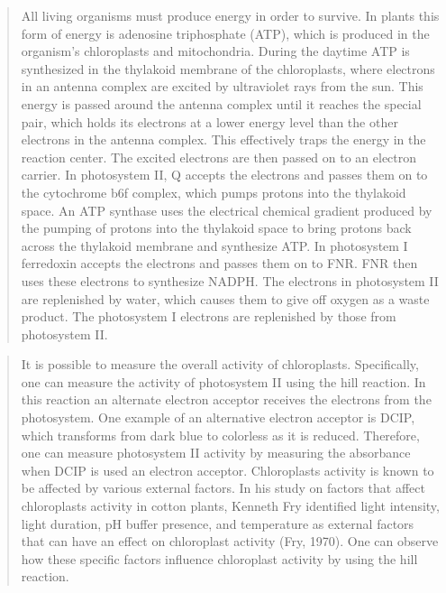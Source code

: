 \documentclass[
]{book}
\begin{document}
\begin{quote}
All living organisms must produce energy in order to survive. In plants this form of energy is adenosine triphosphate (ATP), which is produced in the organism's chloroplasts and mitochondria. During the daytime ATP is synthesized in the thylakoid membrane of the chloroplasts, where electrons in an antenna complex are excited by ultraviolet rays from the sun. This energy is passed around the antenna complex until it reaches the special pair, which holds its electrons at a lower energy level than the other electrons in the antenna complex. This effectively traps the energy in the reaction center. The excited electrons are then passed on to an electron carrier. In photosystem II, Q accepts the electrons and passes them on to the cytochrome b6f complex, which pumps protons into the thylakoid space. An ATP synthase uses the electrical chemical gradient produced by the pumping of protons into the thylakoid space to bring protons back across the thylakoid membrane and synthesize ATP. In photosystem I ferredoxin accepts the electrons and passes them on to FNR. FNR then uses these electrons to synthesize NADPH. The electrons in photosystem II are replenished by water, which causes them to give off oxygen as a waste product. The photosystem I electrons are replenished by those from photosystem II.
\end{quote}

\begin{quote}
It is possible to measure the overall activity of chloroplasts. Specifically, one can measure the activity of photosystem II using the hill reaction. In this reaction an alternate electron acceptor receives the electrons from the photosystem. One example of an alternative electron acceptor is DCIP, which transforms from dark blue to colorless as it is reduced. Therefore, one can measure photosystem II activity by measuring the absorbance when DCIP is used an electron acceptor. Chloroplasts activity is known to be affected by various external factors. In his study on factors that affect chloroplasts activity in cotton plants, Kenneth Fry identified light intensity, light duration, pH buffer presence, and temperature as external factors that can have an effect on chloroplast activity (Fry, 1970). One can observe how these specific factors influence chloroplast activity by using the hill reaction.
\end{quote}
\end{document}
